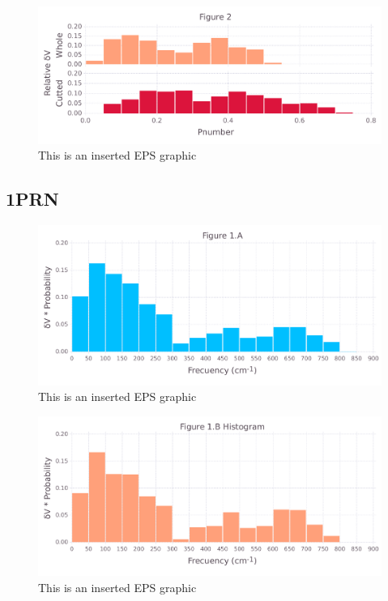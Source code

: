 \documentclass[10pt,letterpaper]{article}
\begin{document}
\begin{figure}[ht]
\begin{center}
\includegraphics[scale=0.5]{1m14/3both_figure_very_hi-precision.pdf}
\caption{This is an inserted EPS graphic}
\label{fig13}
\end{center}
\end{figure}

\FloatBarrier
\newpage

\subsection{1PRN}

\begin{figure}[ht]
\begin{center}
\includegraphics[scale=0.5]{1prn/1afigure_very_hi-precision.pdf}
\caption{This is an inserted EPS graphic}
\label{fig1}
\end{center}
\end{figure}

\begin{figure}[ht]
\begin{center}
\includegraphics[scale=0.5]{1prn/1bfigure_very_hi-precision.pdf}
\caption{This is an inserted EPS graphic}
\label{fig2}
\end{center}
\end{figure}
\end{document}
